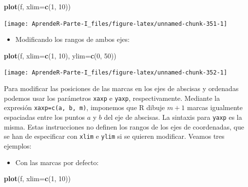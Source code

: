 \documentclass[]{book}
\newenvironment{Shaded}{\begin{snugshade}}{\end{snugshade}}
\newcommand{\DataTypeTok}[1]{\textcolor[rgb]{0.13,0.29,0.53}{#1}}
\newcommand{\DecValTok}[1]{\textcolor[rgb]{0.00,0.00,0.81}{#1}}
\newcommand{\KeywordTok}[1]{\textcolor[rgb]{0.13,0.29,0.53}{\textbf{#1}}}
\newcommand{\NormalTok}[1]{#1}
\providecommand{\tightlist}{%
  \setlength{\itemsep}{0pt}\setlength{\parskip}{0pt}}
\theoremstyle{definition}
\theoremstyle{definition}
\theoremstyle{definition}
\theoremstyle{remark}
\begin{document}
\begin{Shaded}
\begin{Highlighting}[]
\KeywordTok{plot}\NormalTok{(f, }\DataTypeTok{xlim=}\KeywordTok{c}\NormalTok{(}\DecValTok{1}\NormalTok{, }\DecValTok{10}\NormalTok{))    }
\end{Highlighting}
\end{Shaded}

\begin{center}\texttt{[image: AprendeR-Parte-I\_files/figure-latex/unnamed-chunk-351-1]} \end{center}

\begin{itemize}
\tightlist
\item
  Modificando los rangos de ambos ejes:
\end{itemize}

\begin{Shaded}
\begin{Highlighting}[]
\KeywordTok{plot}\NormalTok{(f, }\DataTypeTok{xlim=}\KeywordTok{c}\NormalTok{(}\DecValTok{1}\NormalTok{, }\DecValTok{10}\NormalTok{), }\DataTypeTok{ylim=}\KeywordTok{c}\NormalTok{(}\DecValTok{0}\NormalTok{, }\DecValTok{50}\NormalTok{))  }
\end{Highlighting}
\end{Shaded}

\begin{center}\texttt{[image: AprendeR-Parte-I\_files/figure-latex/unnamed-chunk-352-1]} \end{center}

Para modificar las posiciones de las marcas en los ejes de abscisas y ordenadas podemos usar los parámetros \texttt{xaxp} e \texttt{yaxp}, respectivamente. Mediante la expresión \texttt{xaxp=c(a,\ b,\ m)}, imponemos que R dibuje \(m+1\) marcas igualmente espaciadas entre los puntos \(a\) y \(b\) del eje de abscisas. La sintaxis para \texttt{yaxp} es la misma. Estas instrucciones no definen los rangos de los ejes de coordenadas, que se han de especificar con \texttt{xlim} e \texttt{ylim} si se quieren modificar. Veamos tres ejemplos:

\begin{itemize}
\tightlist
\item
  Con las marcas por defecto:
\end{itemize}

\begin{Shaded}
\begin{Highlighting}[]
\KeywordTok{plot}\NormalTok{(f, }\DataTypeTok{xlim=}\KeywordTok{c}\NormalTok{(}\DecValTok{1}\NormalTok{, }\DecValTok{10}\NormalTok{))}
\end{Highlighting}
\end{Shaded}
\end{document}
